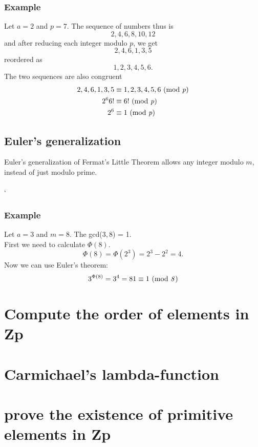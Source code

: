 \documentclass{article}
\begin{document}
 	\subsubsection*{Example}
 	Let $a = 2$ and $ p = 7$. The sequence of numbers thus is
 	$$
 	2,4,6,8,10,12
 	$$
 	and after reducing each integer modulo $p$, we get
 	$$
 	2,4,6,1,3,5
 	$$
 	reordered as
 	$$
 	1,2,3,4,5,6.
 	$$
 	The two sequences are also congruent 
 	\[
 	\begin{split}
	 	2,4,6,1,3,5 &\equiv 1,2,3,4,5,6 \text{ (mod \textit{p})}\\
	 	2^6 6! &\equiv 6! \text{ (mod \textit{p})} \\
	 	2^6 &\equiv 1 \text{ (mod \textit{p})}
 	\end{split}
 	\]
 	
 	\subsection*{Euler's generalization \cite{fermatsummary}}
 	Euler's generalization of Fermat's Little Theorem allows any integer modulo $m$, instead of just modulo prime.
 	\\
 	\\`
 	
 	\subsubsection*{Example}
 	Let $a = 3$ and $m = 8$. The gcd($3, 8$) = 1. 
 	\\
 	First we need to calculate $\Phi(8)$.
 	$$
 	\Phi(8) = \Phi(2^3) = 2^3-2^2 = 4.
 	$$
 	Now we can use Euler's theorem:
 	$$
 	3^{\Phi(8)} = 3^4 = 81 \equiv 1 \text{ (mod \textit{8})}
 	$$
 	
	\section*{Compute the order of elements in Zp} 
	
	\section*{Carmichael's lambda-function} 
	
	\section*{prove the existence of primitive elements in Zp}
	
\end{document}
